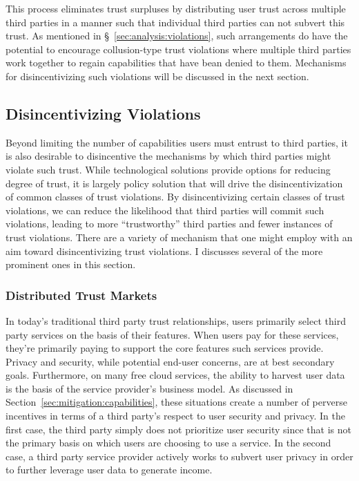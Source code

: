 This process eliminates trust surpluses by distributing user trust
across multiple third parties in a manner such that individual third
parties can not subvert this trust. As mentioned in
\S~\ref{sec:analysis:violations}, such arrangements do have the
potential to encourage collusion-type trust violations where multiple
third parties work together to regain capabilities that have bean
denied to them. Mechanisms for disincentivizing such violations will
be discussed in the next section.

\subsection{Disincentivizing Violations}
\label{sec:mitigation:violations}

Beyond limiting the number of capabilities users must entrust to third
parties, it is also desirable to disincentive the mechanisms by which
third parties might violate such trust.  While technological solutions
provide options for reducing degree of trust, it is largely policy
solution that will drive the disincentivization of common classes of
trust violations. By disincentivizing certain classes of trust
violations, we can reduce the likelihood that third parties will
commit such violations, leading to more ``trustworthy'' third parties
and fewer instances of trust violations. There are a variety of
mechanism that one might employ with an aim toward disincentivizing
trust violations. I discusses several of the more prominent ones in
this section.

\subsubsection{Distributed Trust Markets}

In today's traditional third party trust relationships, users
primarily select third party services on the basis of their
features. When users pay for these services, they're primarily paying
to support the core features such services provide. Privacy and
security, while potential end-user concerns, are at best secondary
goals. Furthermore, on many free cloud services, the ability to
harvest user data is the basis of the service provider's business
model. As discussed in Section~\ref{sec:mitigation:capabilities}, these
situations create a number of perverse incentives in terms of a third
party's respect to user security and privacy. In the first case, the
third party simply does not prioritize user security since that is not
the primary basis on which users are choosing to use a service. In the
second case, a third party service provider actively works to subvert
user privacy in order to further leverage user data to generate
income.

